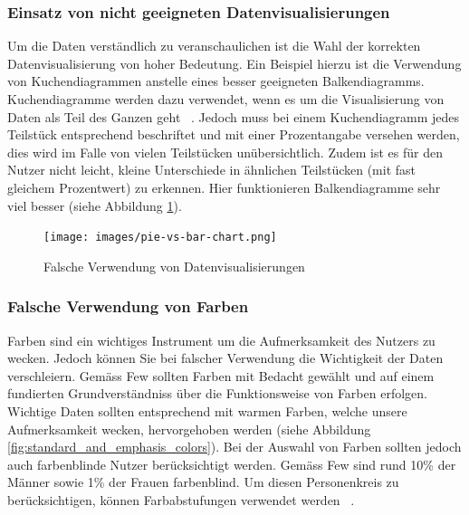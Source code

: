 \subsubsection{Einsatz von nicht geeigneten Datenvisualisierungen}
Um die Daten verständlich zu veranschaulichen ist die Wahl der korrekten Datenvisualisierung von hoher Bedeutung. Ein Beispiel hierzu ist die Verwendung von Kuchendiagrammen anstelle eines besser geeigneten Balkendiagramms. Kuchendiagramme werden dazu verwendet, wenn es um die Visualisierung von Daten als Teil des Ganzen geht ~\citep[S. 59]{information_dashboard_design}. Jedoch muss bei einem Kuchendiagramm jedes Teilstück entsprechend beschriftet und mit einer Prozentangabe versehen werden, dies wird im Falle von vielen Teilstücken unübersichtlich. Zudem ist es für den Nutzer nicht leicht, kleine Unterschiede in ähnlichen Teilstücken (mit fast gleichem Prozentwert) zu erkennen. Hier funktionieren Balkendiagramme sehr viel besser (siehe Abbildung \ref{fig:pie_vs_bar_chart}).

\begin{figure}[h]
    \texttt{[image: images/pie-vs-bar-chart.png]}
    \centering
    \caption{Falsche Verwendung von Datenvisualisierungen ~\citep{pie_vs_bar_chart}}
    \label{fig:pie_vs_bar_chart}
\end{figure}


\subsubsection{Falsche Verwendung von Farben}
Farben sind ein wichtiges Instrument um die Aufmerksamkeit des Nutzers zu wecken. Jedoch können Sie bei falscher Verwendung die Wichtigkeit der Daten verschleiern. Gemäss Few sollten Farben mit Bedacht gewählt und auf einem fundierten Grundverständniss über die Funktionsweise von Farben erfolgen. Wichtige Daten sollten entsprechend mit warmen Farben, welche unsere Aufmerksamkeit wecken, hervorgehoben werden (siehe Abbildung \ref{fig:standard_and_emphasis_colors}). Bei der Auswahl von Farben sollten jedoch auch farbenblinde Nutzer berücksichtigt werden. Gemäss Few sind rund 10\% der Männer sowie 1\% der Frauen farbenblind. Um diesen Personenkreis zu berücksichtigen, können Farbabstufungen verwendet werden ~\citep[S. 75 + 154]{information_dashboard_design}.

